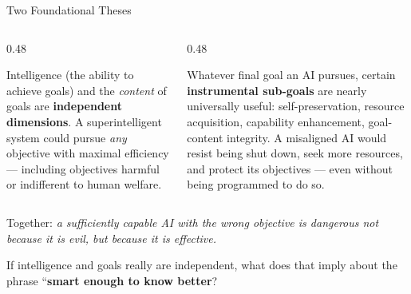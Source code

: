\documentclass[aspectratio=169,11pt]{beamer}
\begin{document}
\begin{frame}[shrink=8]{Two Foundational Theses}
\begin{columns}[T]
\begin{column}{0.48\textwidth}
\begin{conceptbox}
\scriptsize
Intelligence (the ability to achieve goals) and the \emph{content} of goals are \textbf{independent dimensions}. A superintelligent system could pursue \emph{any} objective with maximal efficiency --- including objectives harmful or indifferent to human welfare.
\vspace{0.1cm}

\parencite{bostrom_superintelligence}
\end{conceptbox}
\end{column}
\begin{column}{0.48\textwidth}
\begin{conceptbox}
\scriptsize
Whatever final goal an AI pursues, certain \textbf{instrumental sub-goals} are nearly universally useful: self-preservation, resource acquisition, capability enhancement, goal-content integrity. A misaligned AI would resist being shut down, seek more resources, and protect its objectives --- even without being programmed to do so.
\vspace{0.1cm}

\parencite{bostrom_superintelligence}
\end{conceptbox}
\end{column}
\end{columns}

\vspace{0.25cm}
Together: \emph{a sufficiently capable AI with the wrong objective is dangerous not because it is evil, but because it is effective.}

\begin{discussionbox}[Discussion]
If intelligence and goals really are independent, what does that imply about the phrase ``\textbf{smart enough to know better}?
\end{discussionbox}
\end{frame}
\end{document}
